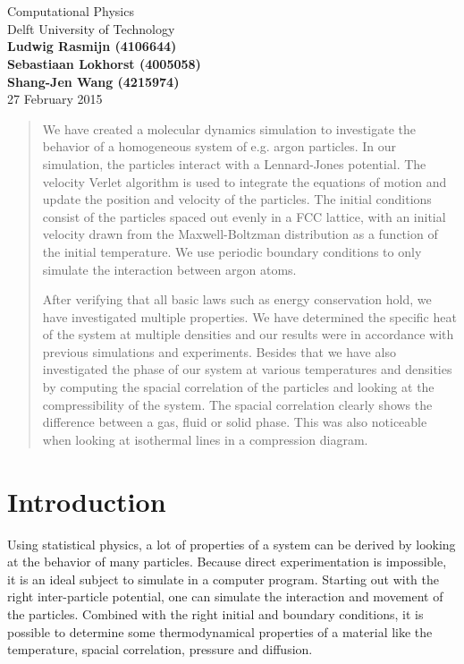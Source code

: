 \documentclass[12pt,a4paper]{report}
\newcommand*{\titleBC}{
	\begingroup
	\centering

	\def\CP{\textit{\Large Simulating argon}}

	\settowidth{\unitlength}{\CP} %
	{\color{CadetBlue}\resizebox*{\unitlength}{\baselineskip}{\rotatebox{90}{$\}$}}} \\[\baselineskip] %
	{\color{Black}{\CP}} \\[\baselineskip] %
	{\color{Black}\large Computational Physics} \\
	{\color{Grey}\large Delft University of Technology} \\
	{\color{CadetBlue}\resizebox*{\unitlength}{\baselineskip}{\rotatebox{-90}{$\}$}}} %
	\vfill
	\large{\textbf{Ludwig Rasmijn (4106644)}}\\
	\large{\textbf{Sebastiaan Lokhorst (4005058)}}\\
	\large{\textbf{Shang-Jen Wang (4215974)}}\\
	\vfill
	\pagestyle{empty}
	27 February 2015

	\endgroup
}
\begin{document}
\pagestyle{empty}
\titleBC

\newpage

\begin{abstract}
We have created a molecular dynamics simulation to investigate the behavior of a homogeneous system of e.g. argon particles. In our simulation, the particles interact with a Lennard-Jones potential. The velocity Verlet algorithm is used to integrate the equations of motion and update the position and velocity of the particles. The initial conditions consist of the particles spaced out evenly in a FCC lattice, with an initial velocity drawn from the Maxwell-Boltzman distribution as a function of the initial temperature. We use periodic boundary conditions to only simulate the interaction between argon atoms.

After verifying that all basic laws such as energy conservation hold, we have investigated multiple properties. We have determined the specific heat of the system at multiple densities and our results were in accordance with previous simulations and experiments. Besides that we have also investigated the phase of our system at various temperatures and densities by computing the spacial correlation of the particles and looking at the compressibility of the system. The spacial correlation clearly shows the difference between a gas, fluid or solid phase. This was also noticeable when looking at isothermal lines in a compression diagram.
\end{abstract}

\newpage

\tableofcontents

\newpage

\pagestyle{fancy}
\fancyhead{}
\fancyfoot{}
\renewcommand{\headrulewidth}{0pt}
\fancyfoot[C]{\thepage}

\chapter{Introduction}

Using statistical physics, a lot of properties of a system can be derived by looking at the behavior of many particles. Because direct experimentation is impossible, it is an ideal subject to simulate in a computer program. Starting out with the right inter-particle potential, one can simulate the interaction and movement of the particles. Combined with the right initial and boundary conditions, it is possible to determine some thermodynamical properties of a material like the temperature, spacial correlation, pressure and diffusion.
\end{document}
